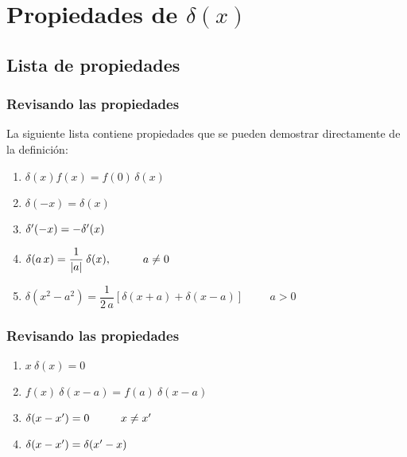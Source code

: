 \documentclass[12pt]{beamer}
\begin{document}
\section{Propiedades de \texorpdfstring{$\delta (x)$}{d (x)}}
\subsection{Lista de propiedades}

\begin{frame}
\frametitle{Revisando las propiedades}
La siguiente lista contiene propiedades que se pueden demostrar directamente de la definición:
\pause
{}
\begin{enumerate}[<+->]
\item $\delta (x) f (x) = f (0) \, \delta (x)$
\item $\delta (-x) = \delta (x)$
\item ${\delta}^{\prime} (- x) = - {\delta}^{\prime} (x)$
\item $\delta(a \, x) = \dfrac{1}{\abs{a}} \: \delta (x), \hspace{1cm} a \neq 0$
\item $\delta (x^{2} - a^{2}) = \dfrac{1}{2 \, a} \left[ \delta (x + a) + \delta (x - a) \right] \hspace{1cm} a > 0$
\seti
\end{enumerate}
\end{frame}
\begin{frame}
\frametitle{Revisando las propiedades}
\begin{enumerate}[<+->]
\conti
\item $x \: \delta(x) = 0$
\item $f (x) \: \delta(x - a) = f(a) \: \delta(x - a)$
\item $\delta (x - {x}^{\prime}) = 0 \hspace{1cm} x \neq {x}^{\prime}$
\item $\delta (x - {x}^{\prime}) = \delta ({x}^{\prime} - x)$
\seti
\end{enumerate}
\end{frame}
\end{document}
